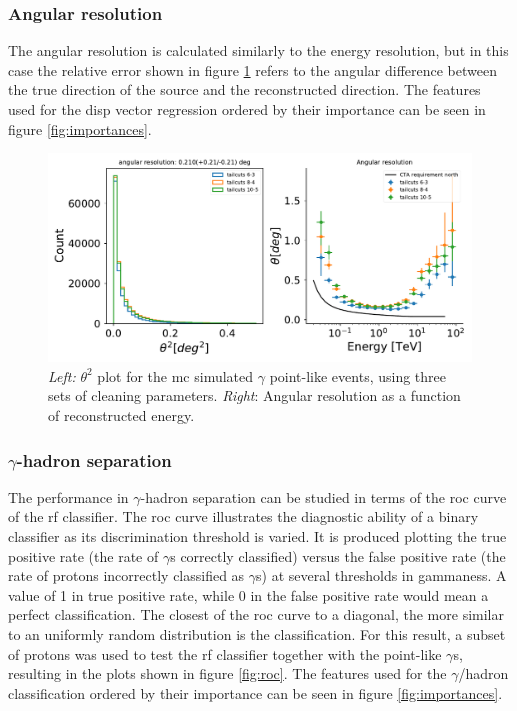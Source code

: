 \documentclass[main.tex]{subfiles}
\begin{document}
\subsubsection{Angular resolution}

The angular resolution is calculated similarly to the energy resolution, but in this case the relative error shown in figure \ref{fig:angres} refers to the angular difference between the true direction of the source and the reconstructed direction. The features used for the disp vector regression ordered by their importance can be seen in figure \ref{fig:importances}.


\begin{figure}
\centering
 \includegraphics[width=1\textwidth]{Pictures/angular_resolution.pdf}
  \caption{\textit{Left:} $\theta^2$ plot for the \gls{mc} simulated $\gamma$ point-like events, using three sets of cleaning parameters. \textit{Right}: Angular resolution as a function of reconstructed energy.}
    \label{fig:angres}
\end{figure}

\subsubsection{$\gamma$-hadron separation}

The performance in $\gamma$-hadron separation can be studied in terms of the \gls{roc} curve of the \gls{rf} classifier. The \gls{roc} curve illustrates the diagnostic ability of a binary classifier as its discrimination threshold is varied. It is produced plotting the true positive rate (the rate of $\gamma$s correctly classified) versus the false positive rate (the rate of protons incorrectly classified as $\gamma$s) at several thresholds in gammaness. A value of 1 in true positive rate, while 0 in the false positive rate would mean a perfect classification. The closest of the \gls{roc} curve to a diagonal, the more similar to an uniformly random distribution is the classification. For this result, a subset of protons was used to test the \gls{rf} classifier together with the point-like $\gamma$s, resulting in the plots shown in figure \ref{fig:roc}. The features used for the $\gamma$/hadron classification ordered by their importance can be seen in figure \ref{fig:importances}.
\end{document}
